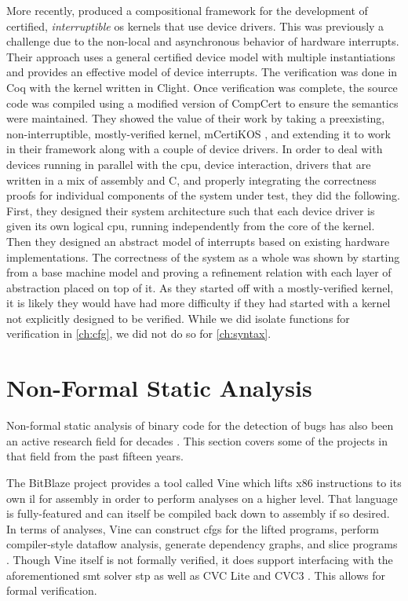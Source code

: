More recently, \textcite{chen2018compositional} produced a compositional framework
for the development of certified, \emph{interruptible}%
\ac{os} kernels that use device drivers.%
This was previously a challenge due to the non-local and asynchronous behavior
of hardware interrupts. Their approach uses a general certified device model
with multiple instantiations and provides an effective model of device interrupts.
The verification was done in Coq with the kernel written in Clight.
Once verification was complete, the source code was compiled using a modified version
of CompCert to ensure the semantics were maintained.
They showed the value of their work by taking a preexisting,
non-interruptible, mostly-verified kernel, mCertiKOS \autocite{costanzo2016endtoend},
and extending it to work in their framework along with a couple of device drivers.
In order to deal with devices running in parallel with the \ac{cpu},
device interaction, drivers that are written in a mix of assembly and C,
and properly integrating the correctness proofs for individual components
of the system under test, they did the following.
First, they designed their system architecture such that each device driver
is given its own logical \ac{cpu}, running independently from the core of the kernel.
Then they designed an abstract model of interrupts
based on existing hardware implementations.
The correctness of the system as a whole was shown
by starting from a base machine model
and proving a refinement relation with each layer of abstraction placed on top of it.
As they started off with a mostly-verified kernel, it is likely they would have had
more difficulty if they had started with a kernel
not explicitly designed to be verified. While we did isolate functions
for verification in \cref{ch:cfg}, we did not do so for \cref{ch:syntax}.

\section{Non-Formal Static Analysis}\label{se:static_analysis}
Non-formal static analysis of binary code for the detection of bugs
has also been an active research field for decades
\autocite{kruegel2005automating,brumley2011bap,wang2017angr}.
This section covers some of the projects in that field from the past fifteen years.

The BitBlaze project \autocite{song2008bitblaze,BitBlazeWebSite}
provides a tool called Vine which lifts x86 instructions to its own \ac{il} for assembly
in order to perform analyses on a higher level.
That language is fully-featured and can itself be compiled back down to assembly
if so desired.
In terms of analyses, Vine can construct \acp{cfg} for the lifted programs,
perform compiler-style dataflow analysis, generate dependency graphs,
and slice programs \autocite{weiser1981slicing,tip1995survey}.
Though Vine itself is not formally verified,
it does support interfacing with the aforementioned \ac{smt} solver \ac{stp}
as well as CVC Lite \autocite{barrett2004cvcl} and CVC3 \autocite{barrett2007cvc3}.
This allows for formal verification.


